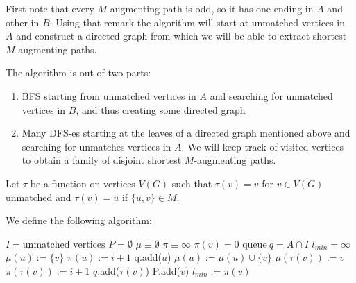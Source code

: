 \begin{exercise}{2}
\begin{enumerate}[i)]
{            First note that every $M$-augmenting path is odd, so it has one
            ending in $A$ and other in $B$. Using that remark the algorithm will
            start at unmatched vertices in $A$ and construct a directed graph
            from which we will be able to extract shortest $M$-augmenting paths.

            The algorithm is out of two parts:
            \begin{enumerate}
                \item{BFS starting from unmatched vertices in $A$ and searching
                    for unmatched vertices in $B$, and thus creating some directed
                    graph}
                \item{Many DFS-es starting at the leaves of a directed graph
                    mentioned above and searching for unmatches vertices in $A$.
                    We will keep track of visited vertices to obtain a family of
                    disjoint shortest $M$-augmenting paths.}
            \end{enumerate}

            Let $\tau$ be a function on vertices $V(G)$ such that $\tau(v) = v$
            for $v \in V(G)$ unmatched and $\tau(v) = u$ if $\{u, v\} \in M$.

            We define the following algorithm:
            \begin{algorithmic}
                \State $I = \text{unmatched vertices}$
                \State $P = \emptyset$ 
                \State $\mu \equiv \emptyset$ 
                \State $\pi \equiv \infty$ 
                    \State $\pi(v) = 0$
                \EndFor
                \State $\text{queue}\ q = A \cap I$ 
                \State $l_{min} = \infty$
                                \State $\mu(u) := \{v\}$
                                \State $\pi(u) := i + 1$
                                \State q.add($u$)
                                \State $\mu(u) := \mu(u) \cup \{v\}$
                            \EndIf
                        \EndFor
                        \State $\mu(\tau(v)) := v$
                        \State $\pi(\tau(v)) := i + 1$
                        \State $q$.add($\tau(v)$)
                    \Else
                        \State P.add($v$)
                        \State $l_{min} := \pi(v)$
                    \EndIf
                \EndWhile
                \State {}


\end{algorithmic}}
\end{enumerate}
\end{exercise}
